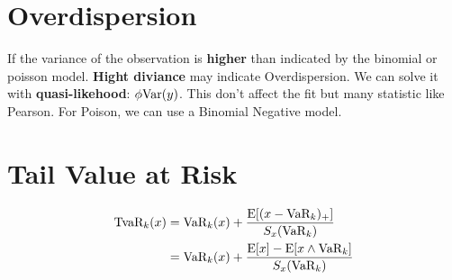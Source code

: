 \documentclass[10pt, french]{article}
\begin{document}
\begin{multicols*}{3}
\section*{Overdispersion}
If the variance of the observation is \textbf{higher} than indicated by the binomial or poisson model. 
\textbf{Hight diviance} may indicate Overdispersion. We can solve it with \textbf{quasi-likehood}: 
$\phi \mathrm{Var} {\left( y \right)}$. This don't affect the fit but many statistic like Pearson. For Poison, we can use
a Binomial Negative model.

\section*{Tail Value at Risk}
\begin{align*}
    \text{TvaR}_k(x) &= \text{VaR}_k(x) + \frac{\mathrm{E} {\left[ (x - \text{VaR}_k)_+ \right]}}{S_x(\text{VaR}_k)} \\
                     &= \text{VaR}_k(x) + \frac{\mathrm{E} {\left[ x \right]} - \mathrm{E} {\left[ x \wedge \text{VaR}_k \right]}}{S_x(\text{VaR}_k)}
\end{align*}



\end{multicols*}
\end{document}
